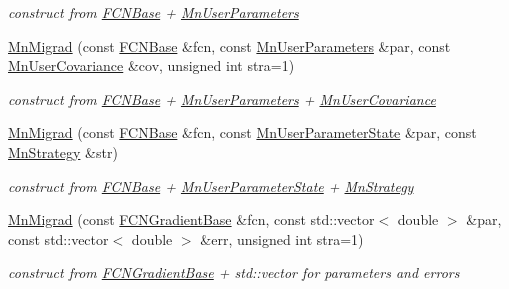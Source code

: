 \begin{DoxyCompactItemize}
\begin{DoxyCompactList}\small\item\em construct from \mbox{\hyperlink{classROOT_1_1Minuit2_1_1FCNBase}{F\+C\+N\+Base}} + \mbox{\hyperlink{classROOT_1_1Minuit2_1_1MnUserParameters}{Mn\+User\+Parameters}} \end{DoxyCompactList}\item 
\mbox{\hyperlink{classROOT_1_1Minuit2_1_1MnMigrad_a02f279b4f09d995ed7c29abd203b9897}{Mn\+Migrad}} (const \mbox{\hyperlink{classROOT_1_1Minuit2_1_1FCNBase}{F\+C\+N\+Base}} \&fcn, const \mbox{\hyperlink{classROOT_1_1Minuit2_1_1MnUserParameters}{Mn\+User\+Parameters}} \&par, const \mbox{\hyperlink{classROOT_1_1Minuit2_1_1MnUserCovariance}{Mn\+User\+Covariance}} \&cov, unsigned int stra=1)
\begin{DoxyCompactList}\small\item\em construct from \mbox{\hyperlink{classROOT_1_1Minuit2_1_1FCNBase}{F\+C\+N\+Base}} + \mbox{\hyperlink{classROOT_1_1Minuit2_1_1MnUserParameters}{Mn\+User\+Parameters}} + \mbox{\hyperlink{classROOT_1_1Minuit2_1_1MnUserCovariance}{Mn\+User\+Covariance}} \end{DoxyCompactList}\item 
\mbox{\hyperlink{classROOT_1_1Minuit2_1_1MnMigrad_a6ee8b2dacc7c6255fdae62f851acaa48}{Mn\+Migrad}} (const \mbox{\hyperlink{classROOT_1_1Minuit2_1_1FCNBase}{F\+C\+N\+Base}} \&fcn, const \mbox{\hyperlink{classROOT_1_1Minuit2_1_1MnUserParameterState}{Mn\+User\+Parameter\+State}} \&par, const \mbox{\hyperlink{classROOT_1_1Minuit2_1_1MnStrategy}{Mn\+Strategy}} \&str)
\begin{DoxyCompactList}\small\item\em construct from \mbox{\hyperlink{classROOT_1_1Minuit2_1_1FCNBase}{F\+C\+N\+Base}} + \mbox{\hyperlink{classROOT_1_1Minuit2_1_1MnUserParameterState}{Mn\+User\+Parameter\+State}} + \mbox{\hyperlink{classROOT_1_1Minuit2_1_1MnStrategy}{Mn\+Strategy}} \end{DoxyCompactList}\item 
\mbox{\hyperlink{classROOT_1_1Minuit2_1_1MnMigrad_a2c295cfd762493e53e71d2cd004c3061}{Mn\+Migrad}} (const \mbox{\hyperlink{classROOT_1_1Minuit2_1_1FCNGradientBase}{F\+C\+N\+Gradient\+Base}} \&fcn, const std\+::vector$<$ double $>$ \&par, const std\+::vector$<$ double $>$ \&err, unsigned int stra=1)
\begin{DoxyCompactList}\small\item\em construct from \mbox{\hyperlink{classROOT_1_1Minuit2_1_1FCNGradientBase}{F\+C\+N\+Gradient\+Base}} + std\+::vector for parameters and errors \end{DoxyCompactList}\item 

\end{DoxyCompactItemize}
